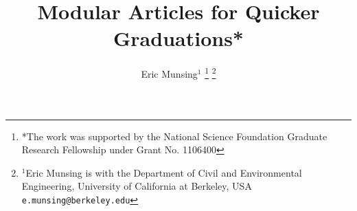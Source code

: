 \documentclass[letterpaper, 10 pt, conference]{ieeeconf}
\title{\LARGE \bf
Modular Articles for Quicker Graduations*
}
\author{Eric Munsing$^{1}$%
\thanks{*The work was supported by the National Science Foundation Graduate Research Fellowship under Grant No. 1106400}%
\thanks{$^{1}$Eric Munsing is with the Department of Civil and Environmental Engineering, University of California at Berkeley, USA {\tt\small e.munsing@berkeley.edu}}%
}
\begin{document}
\maketitle
\thispagestyle{empty}
\pagestyle{empty}


\begin{abstract}
\lipsum[7-8]
\end{abstract}




 

\appendix

\end{document}
